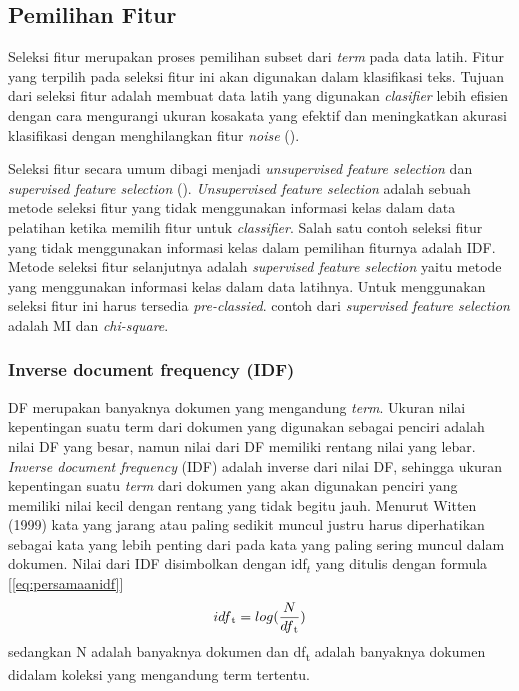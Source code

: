 \subsection*{Pemilihan Fitur}

Seleksi fitur merupakan proses pemilihan subset dari \textit{term} pada data latih. Fitur yang terpilih pada seleksi fitur ini akan digunakan dalam klasifikasi teks. Tujuan dari seleksi fitur adalah membuat data latih yang digunakan \textit{clasifier} lebih efisien dengan cara mengurangi ukuran kosakata yang efektif dan meningkatkan akurasi klasifikasi dengan menghilangkan fitur \textit{noise} (\cite{MANNING2008}).

Seleksi fitur secara umum dibagi menjadi \textit{unsupervised feature selection} dan \textit{supervised feature selection} (\cite{garnes2009}). \textit{Unsupervised feature selection} adalah sebuah metode seleksi fitur yang tidak menggunakan informasi kelas dalam data pelatihan ketika memilih fitur untuk \textit{classifier}. Salah satu contoh seleksi fitur yang tidak menggunakan informasi kelas dalam pemilihan fiturnya adalah IDF.
Metode seleksi fitur selanjutnya adalah \textit{supervised feature selection} yaitu metode yang menggunakan informasi kelas dalam data latihnya. Untuk menggunakan seleksi fitur ini harus tersedia \textit{pre-classied}. contoh dari \textit{supervised feature selection} adalah MI dan \textit{chi-square}.

\subsubsection*{Inverse document frequency (IDF)}

DF merupakan banyaknya dokumen yang mengandung \textit{term}. Ukuran nilai kepentingan suatu term dari dokumen yang digunakan sebagai penciri adalah nilai DF yang besar, namun nilai dari DF memiliki rentang nilai yang lebar. \textit{Inverse document frequency} (IDF) adalah inverse dari nilai DF, sehingga ukuran kepentingan suatu \textit{term} dari dokumen yang akan digunakan penciri yang memiliki nilai kecil dengan rentang yang tidak begitu jauh. Menurut Witten (1999) kata yang jarang atau paling sedikit muncul justru harus diperhatikan sebagai kata yang lebih penting dari pada kata yang paling sering muncul dalam dokumen. Nilai dari IDF disimbolkan dengan  idf$_t$  yang ditulis dengan formula [\ref{eq:persamaanidf}]
\begin{equation}
idf\textsubscript{t} = log(\frac{N}{df\textsubscript{t}})
\label{eq:persamaanidf}
\end{equation}
sedangkan N adalah banyaknya dokumen dan df\textsubscript{t} adalah banyaknya dokumen didalam koleksi yang mengandung term tertentu.

